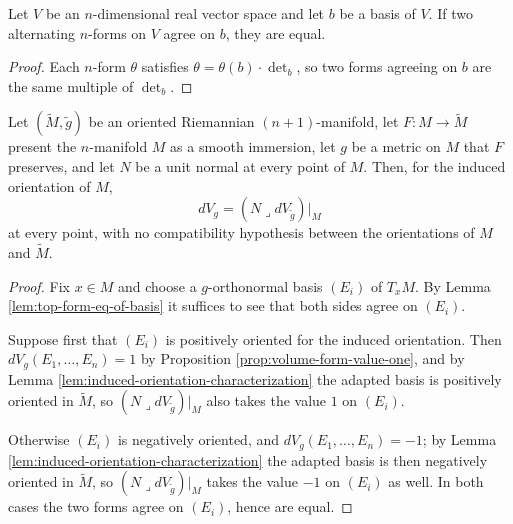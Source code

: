 \begin{lemma}
\label{lem:top-form-eq-of-basis}
\leanok
Let $V$ be an $n$-dimensional real vector space and let $b$ be a basis of $V$. If two alternating
$n$-forms on $V$ agree on $b$, they are equal.
\end{lemma}

\begin{proof}
\leanok
Each $n$-form $\theta$ satisfies $\theta = \theta(b) \cdot \det_b$, so two forms agreeing on $b$
are the same multiple of $\det_b$.
\end{proof}

\begin{proposition}
\label{prop:hypersurface-volume-form-induced}
\leanok
{}
Let $(\tilde M, \tilde g)$ be an oriented Riemannian $(n+1)$-manifold, let $F : M \to \tilde M$
present the $n$-manifold $M$ as a smooth immersion, let $g$ be a metric on $M$ that $F$
preserves, and let $N$ be a unit normal at every point of $M$. Then, for the induced orientation
of $M$,
\[
  dV_g = (N \lrcorner dV_{\tilde{g}})|_M
\]
at every point, with no compatibility hypothesis between the orientations of $M$ and $\tilde M$.
\end{proposition}

\begin{proof}
\leanok
{}
Fix $x \in M$ and choose a $g$-orthonormal basis $(E_i)$ of $T_x M$. By Lemma
\ref{lem:top-form-eq-of-basis} it suffices to see that both sides agree on $(E_i)$.

Suppose first that $(E_i)$ is positively oriented for the induced orientation. Then
$dV_g(E_1,\ldots,E_n) = 1$ by Proposition \ref{prop:volume-form-value-one}, and by Lemma
\ref{lem:induced-orientation-characterization} the adapted basis is positively oriented in
$\tilde M$, so $(N \lrcorner dV_{\tilde g})|_M$ also takes the value $1$ on $(E_i)$.

Otherwise $(E_i)$ is negatively oriented, and $dV_g(E_1,\ldots,E_n) = -1$; by Lemma
\ref{lem:induced-orientation-characterization} the adapted basis is then negatively oriented in
$\tilde M$, so $(N \lrcorner dV_{\tilde g})|_M$ takes the value $-1$ on $(E_i)$ as well. In both
cases the two forms agree on $(E_i)$, hence are equal.
\end{proof}

